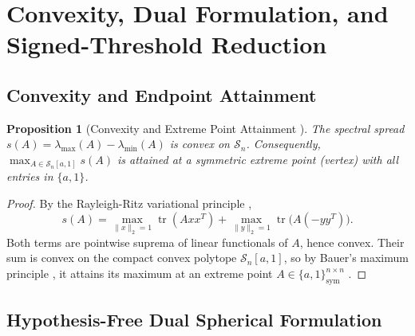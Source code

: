 \documentclass[11pt,reqno]{article}
\newtheorem{proposition}[theorem]{Proposition}
\theoremstyle{definition}
\newcommand{\tr}{\operatorname{tr}}
\begin{document}
\section{Convexity, Dual Formulation, and Signed-Threshold Reduction}

\subsection{Convexity and Endpoint Attainment}

\begin{proposition}[Convexity and Extreme Point Attainment {\cite{biborski2022spread,hornjohnson2012}}]\label{prop:convexity}
The spectral spread $s(A) = \lambda_{\max}(A) - \lambda_{\min}(A)$ is convex on $\mathcal{S}_n$. Consequently, $\max_{A \in \mathcal{S}_n[a, 1]} s(A)$ is attained at a symmetric extreme point (vertex) with all entries in $\{a, 1\}$.
\end{proposition}
\begin{proof}
By the Rayleigh-Ritz variational principle \cite{hornjohnson2012},
\[
s(A) = \max_{\|x\|_2 = 1} \tr(A x x^T) + \max_{\|y\|_2 = 1} \tr\bigl(A (-y y^T)\bigr).
\]
Both terms are pointwise suprema of linear functionals of $A$, hence convex. Their sum is convex on the compact convex polytope $\mathcal{S}_n[a, 1]$, so by Bauer's maximum principle \cite{hornjohnson2012}, it attains its maximum at an extreme point $A \in \{a, 1\}^{n \times n}_{\text{sym}}$ \cite{biborski2022spread}.
\end{proof}

\subsection{Hypothesis-Free Dual Spherical Formulation}
\end{document}
